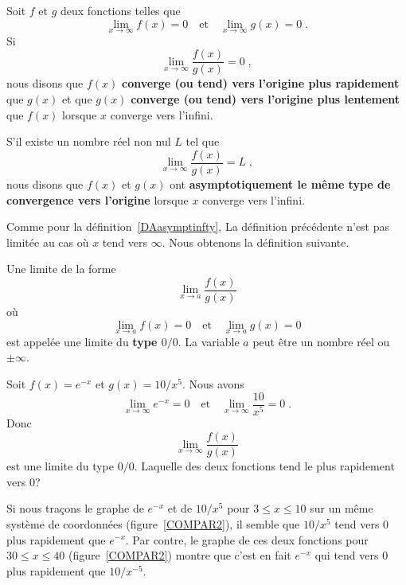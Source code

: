 {\begin{defn} 
Soit $f$ et $g$ deux fonctions telles que
\[
\lim_{x \rightarrow \infty} f(x) = 0 \quad \text{et} \quad
\lim_{x \rightarrow \infty} g(x) = 0 \; .
\]
Si
\[
\lim_{x \rightarrow \infty} \frac{f(x)}{g(x)} = 0 \; ,
\]
nous disons que $f(x)$
{\bfseries converge (ou tend) vers l'origine plus rapidement}
que $g(x)$ et que $g(x)$
{\bfseries converge (ou tend) vers l'origine plus lentement}
que $f(x)$ lorsque $x$ converge vers l'infini.

S'il existe un nombre réel non nul $L$ tel que
\[
\lim_{x \rightarrow \infty} \frac{f(x)}{g(x)} = L \; ,
\]
nous disons que $f(x)$ et $g(x)$ ont {\bfseries asymptotiquement le même
type de convergence vers l'origine} lorsque $x$ converge vers
l'infini.
\end{defn}

Comme pour la définition~\ref{DAasymptinfty}, La définition précédente
n'est pas limitée au cas où $x$ tend vers $\infty$.  Nous obtenons la
définition suivante.

\begin{defn}
Une limite de la forme
\[
\lim_{x \rightarrow a} \frac{f(x)}{g(x)}
\]
où
\[
\lim_{x\rightarrow a} f(x) = 0 \quad \text{et} \quad
\lim_{x\rightarrow a} g(x) = 0
\]
est appelée une limite du {\bfseries type $0/0$}.  La variable $a$
peut être un nombre réel ou $\pm \infty$.
\end{defn}

\begin{egg}
Soit $f(x) = e^{-x}$ et $g(x)= 10/x^5$.  Nous avons
\[
\lim_{x\rightarrow \infty} e^{-x} = 0 \quad \text{et} \quad
\lim_{x\rightarrow \infty} \frac{10}{x^5} = 0 \; .
\]
Donc
\[
\lim_{x \rightarrow \infty} \frac{f(x)}{g(x)}
\]
est une limite du type $0/0$.  Laquelle des deux fonctions tend le
plus rapidement vers $0$? 

Si nous traçons le graphe de $e^{-x}$ et de $10/x^5$ pour
$3\leq x \leq 10$ sur un même système de coordonnées
(figure~\ref{COMPAR2}), il semble que $10/x^5$ tend vers $0$ plus
rapidement que $e^{-x}$.  Par contre, le graphe de ces deux fonctions
pour $30\leq x \leq 40$ (figure~\ref{COMPAR2}) montre que c'est
en fait $e^{-x}$ qui tend vers $0$ plus rapidement que $10/x^{-5}$.


\end{egg}}
